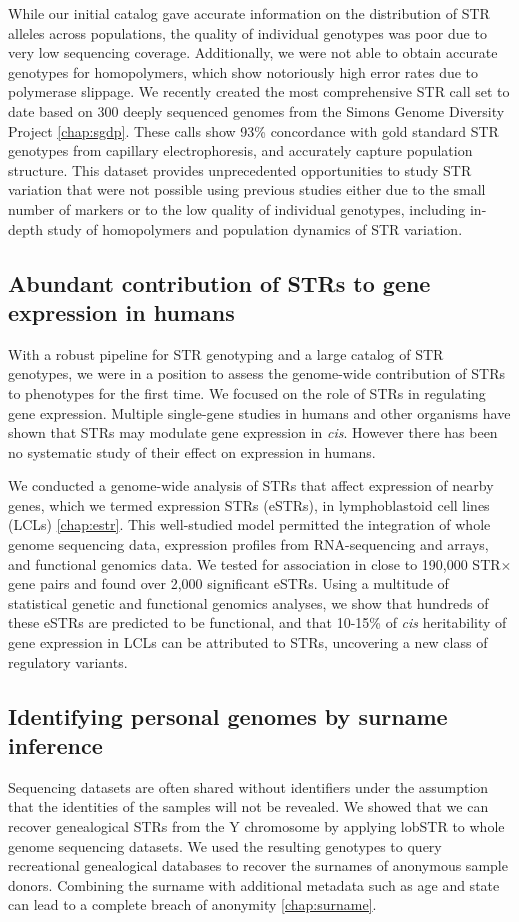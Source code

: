 While our initial catalog gave accurate information on the distribution of STR alleles across populations, the quality of individual genotypes was poor due to very low sequencing coverage. Additionally, we were not able to obtain accurate genotypes for homopolymers, which show notoriously high error rates due to polymerase slippage. We recently created the most comprehensive STR call set to date based on 300 deeply sequenced genomes from the Simons Genome Diversity Project \autoref{chap:sgdp}. These calls show 93\% concordance with gold standard STR genotypes from capillary electrophoresis, and accurately capture population structure. This dataset provides unprecedented opportunities to study STR variation that were not possible using previous studies either due to the small number of markers or to the low quality of individual genotypes, including in-depth study of homopolymers and population dynamics of STR variation.

\subsection{Abundant contribution of STRs to gene expression in humans}
With a robust pipeline for STR genotyping and a large catalog of STR genotypes, we were in a position to assess the genome-wide contribution of STRs to phenotypes for the first time. We focused on the role of STRs in regulating gene expression. Multiple single-gene studies in humans and other organisms have shown that STRs may modulate gene expression in \emph{cis}. However there has been no systematic study of their effect on expression in humans.

We conducted a genome-wide analysis of STRs that affect expression of nearby genes, which we termed expression STRs (eSTRs), in lymphoblastoid cell lines (LCLs) \cite{GymrekWillemsGuilmatreEtAl2015} \autoref{chap:estr}. This well-studied model permitted the integration of whole genome sequencing data, expression profiles from RNA-sequencing and arrays, and functional genomics data. We tested for association in close to 190,000 STR$\times$gene pairs and found over 2,000 significant eSTRs. Using a multitude of statistical genetic and functional genomics analyses, we show that hundreds of these eSTRs are predicted to be functional, and that 10-15\% of \emph{cis} heritability of gene expression in LCLs can be attributed to STRs, uncovering a new class of regulatory variants.

\subsection{Identifying personal genomes by surname inference}
Sequencing datasets are often shared without identifiers under the assumption that the identities of the samples will not be revealed. We showed that we can recover genealogical STRs from the Y chromosome by applying lobSTR to whole genome sequencing datasets. We used the resulting genotypes to query recreational genealogical databases to recover the surnames of anonymous sample donors. Combining the surname with additional metadata such as age and state can lead to a complete breach of anonymity \cite{GymrekMcGuireGolanEtAl2013} \autoref{chap:surname}.

